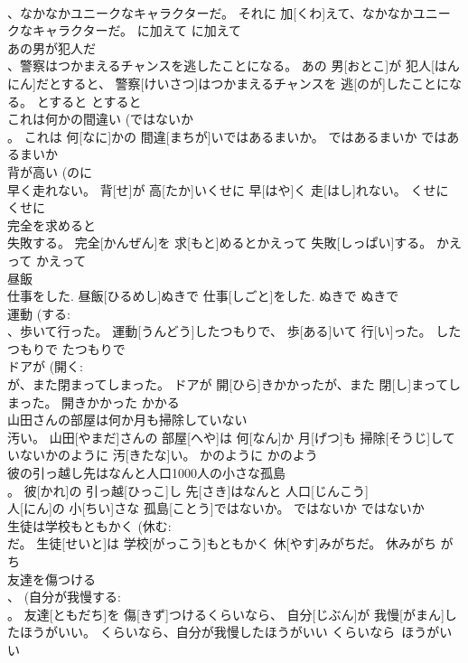 \documentclass[8pt]{extreport}
\begin{document}
\begin{CJK}{UTF8}{min}
\\	、なかなかユニークなキャラクターだ。	それに 加[くわ]えて、なかなかユニークなキャラクターだ。	に加えて	に加えて	
\\	あの男が犯人だ 
\\	、警察はつかまえるチャンスを逃したことになる。	あの 男[おとこ]が 犯人[はんにん]だとすると、 警察[けいさつ]はつかまえるチャンスを 逃[のが]したことになる。	とすると	とすると	
\\	これは何かの間違い (ではないか 
\\	。	これは 何[なに]かの 間違[まちが]いではあるまいか。	ではあるまいか	ではあるまいか	
\\	背が高い (のに 
\\	早く走れない。	背[せ]が 高[たか]いくせに 早[はや]く 走[はし]れない。	くせに	くせに	
\\	完全を求めると 
\\	失敗する。	完全[かんぜん]を 求[もと]めるとかえって 失敗[しっぱい]する。	かえって	かえって~	
\\	昼飯 
\\	仕事をした.	昼飯[ひるめし]ぬきで 仕事[しごと]をした.	ぬきで	ぬきで	
\\	運動 (する: 
\\	、歩いて行った。	運動[うんどう]したつもりで、 歩[ある]いて 行[い]った。	したつもりで	たつもりで	
\\	ドアが (開く: 
\\	が、また閉まってしまった。	ドアが 開[ひら]きかかったが、また 閉[し]まってしまった。	開きかかった	かかる	
\\	山田さんの部屋は何か月も掃除していない 
\\	汚い。	山田[やまだ]さんの 部屋[へや]は 何[なん]か 月[げつ]も 掃除[そうじ]していないかのように 汚[きたな]い。	かのように	かのよう	
\\	彼の引っ越し先はなんと人口1000人の小さな孤島 
\\	。	彼[かれ]の 引っ越[ひっこ]し 先[さき]はなんと 人口[じんこう] 
\\	人[にん]の 小[ちい]さな 孤島[ことう]ではないか。	ではないか	ではないか	
\\	生徒は学校もともかく (休む: 
\\	だ。	生徒[せいと]は 学校[がっこう]もともかく 休[やす]みがちだ。	休みがち	がち	
\\	友達を傷つける 
\\	、 (自分が我慢する: 
\\	。	友達[ともだち]を 傷[きず]つけるくらいなら、 自分[じぶん]が 我慢[がまん]したほうがいい。	くらいなら、自分が我慢したほうがいい	くらいなら~ほうがいい	

\end{CJK}
\end{document}
